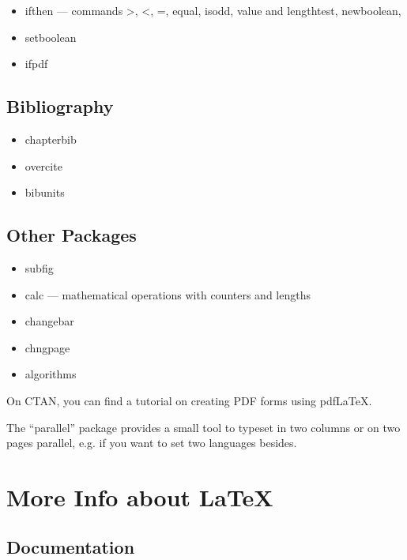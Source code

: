 \documentclass{boostreport}
\begin{document}
\begin{itemize}
    \item ifthen --- commands >, <, =, equal, isodd, value and lengthtest,
    newboolean,
    \item setboolean
    \item ifpdf
\end{itemize}

\subsection{Bibliography}
\label{sec:bibliography}

\begin{itemize}
    \item chapterbib
    \item overcite
    \item bibunits
\end{itemize}

\subsection{Other Packages}
\label{sec:others}

\begin{itemize}
    \item subfig
    \item calc --- mathematical operations with counters and lengths
    \item changebar
    \item chngpage
    \item algorithms
\end{itemize}

On CTAN, you can find a tutorial on creating PDF forms using pdfLaTeX.

The ``parallel'' package provides a small tool to typeset in two columns or
on two pages parallel, e.g. if you want to set two languages besides.


\section{More Info about \LaTeX{}}
\label{sec:more-info-about}

\subsection{Documentation}
\label{sec:documentation}
\end{document}
